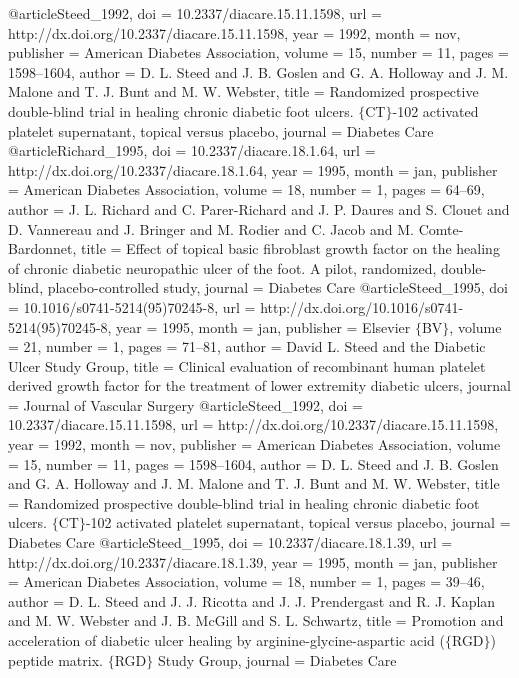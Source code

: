 @article{Steed_1992,
	doi = {10.2337/diacare.15.11.1598},
	url = {http://dx.doi.org/10.2337/diacare.15.11.1598},
	year = 1992,
	month = {nov},
	publisher = {American Diabetes Association},
	volume = {15},
	number = {11},
	pages = {1598--1604},
	author = {D. L. Steed and J. B. Goslen and G. A. Holloway and J. M. Malone and T. J. Bunt and M. W. Webster},
	title = {Randomized prospective double-blind trial in healing chronic diabetic foot ulcers. $\lbrace$CT$\rbrace$-102 activated platelet supernatant, topical versus placebo},
	journal = {Diabetes Care}
}
@article{Richard_1995,
	doi = {10.2337/diacare.18.1.64},
	url = {http://dx.doi.org/10.2337/diacare.18.1.64},
	year = 1995,
	month = {jan},
	publisher = {American Diabetes Association},
	volume = {18},
	number = {1},
	pages = {64--69},
	author = {J. L. Richard and C. Parer-Richard and J. P. Daures and S. Clouet and D. Vannereau and J. Bringer and M. Rodier and C. Jacob and M. Comte-Bardonnet},
	title = {Effect of topical basic fibroblast growth factor on the healing of chronic diabetic neuropathic ulcer of the foot. A pilot, randomized, double-blind, placebo-controlled study},
	journal = {Diabetes Care}
}
@article{Steed_1995,
	doi = {10.1016/s0741-5214(95)70245-8},
	url = {http://dx.doi.org/10.1016/s0741-5214(95)70245-8},
	year = 1995,
	month = {jan},
	publisher = {Elsevier $\lbrace$BV$\rbrace$},
	volume = {21},
	number = {1},
	pages = {71--81},
	author = {David L. Steed and the Diabetic Ulcer Study Group},
	title = {Clinical evaluation of recombinant human platelet {\textendash} derived growth factor for the treatment of lower extremity diabetic ulcers},
	journal = {Journal of Vascular Surgery}
}
@article{Steed_1992,
	doi = {10.2337/diacare.15.11.1598},
	url = {http://dx.doi.org/10.2337/diacare.15.11.1598},
	year = 1992,
	month = {nov},
	publisher = {American Diabetes Association},
	volume = {15},
	number = {11},
	pages = {1598--1604},
	author = {D. L. Steed and J. B. Goslen and G. A. Holloway and J. M. Malone and T. J. Bunt and M. W. Webster},
	title = {Randomized prospective double-blind trial in healing chronic diabetic foot ulcers. $\lbrace$CT$\rbrace$-102 activated platelet supernatant, topical versus placebo},
	journal = {Diabetes Care}
}
@article{Steed_1995,
	doi = {10.2337/diacare.18.1.39},
	url = {http://dx.doi.org/10.2337/diacare.18.1.39},
	year = 1995,
	month = {jan},
	publisher = {American Diabetes Association},
	volume = {18},
	number = {1},
	pages = {39--46},
	author = {D. L. Steed and J. J. Ricotta and J. J. Prendergast and R. J. Kaplan and M. W. Webster and J. B. McGill and S. L. Schwartz},
	title = {Promotion and acceleration of diabetic ulcer healing by arginine-glycine-aspartic acid ($\lbrace$RGD$\rbrace$) peptide matrix. $\lbrace$RGD$\rbrace$ Study Group},
	journal = {Diabetes Care}
}

